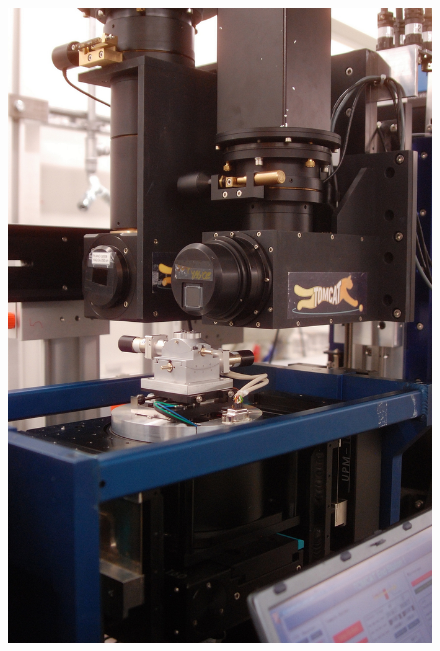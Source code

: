 \begin{figure}[p]
{{			\includegraphics[width=\imsize]{img/TOMCAT2}%
			\label{subfig:TOMCAT2}%
		}%
		\subfloat[Sample]{%
}}
\end{figure}
